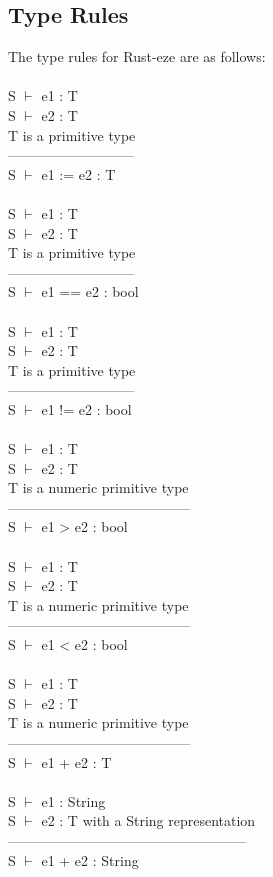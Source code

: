 \documentclass[letterpaper, 10pt, DIV=13]{scrartcl}
\numberwithin{equation}{section}
\numberwithin{figure}{section}
\numberwithin{table}{section}
\begin{document}
\subsection{Type Rules}
The type rules for Rust-eze are as follows: \\ \\
S $\vdash$ e1 : T \\
S $\vdash$ e2 : T \\
T is a primitive type \\
--------------------------- \\
S $\vdash$ e1 := e2 : T \\
\\
S $\vdash$ e1 : T \\
S $\vdash$ e2 : T \\
T is a primitive type \\
--------------------------- \\
S $\vdash$ e1 == e2 : bool \\
\\
S $\vdash$ e1 : T \\
S $\vdash$ e2 : T \\
T is a primitive type \\
--------------------------- \\
S $\vdash$ e1 != e2 : bool \\
\\
S $\vdash$ e1 : T \\
S $\vdash$ e2 : T \\
T is a numeric primitive type \\
--------------------------------------- \\
S $\vdash$ e1 > e2 : bool \\
\\
S $\vdash$ e1 : T \\
S $\vdash$ e2 : T \\
T is a numeric primitive type \\
--------------------------------------- \\
S $\vdash$ e1 < e2 : bool \\
\\
S $\vdash$ e1 : T \\
S $\vdash$ e2 : T \\
T is a numeric primitive type \\
--------------------------------------- \\
S $\vdash$ e1 + e2 : T \\
\\
S $\vdash$ e1 : String \\
S $\vdash$ e2 : T with a String representation \\
--------------------------------------------------- \\
S $\vdash$ e1 + e2 : String
\end{document}
